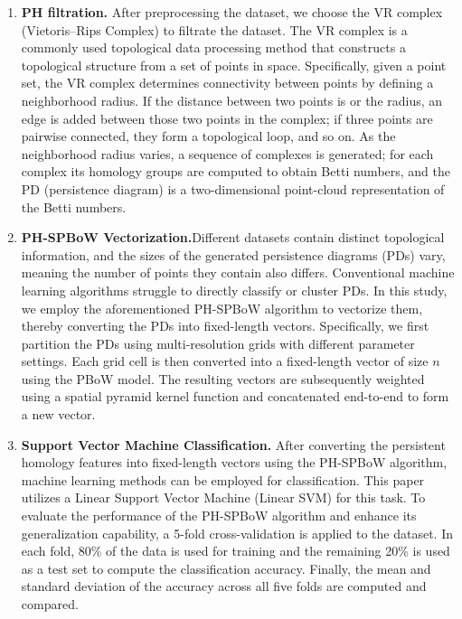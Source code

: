 \documentclass[5GeSdc,ASOC,numref,printGA,printHL,CASflow,nocrossmark,longtitle,PROOF]{/usr/local/texlive/iTemplates/01-Templates/01-Els-Jnl/01-Standard_Templates/V1/ELS_MDL5-V1-6}
\begin{document}
\begin{articlestyle}
\begin{enumerate}
	\item[b)] \textbf{PH filtration.} After preprocessing the dataset, we choose the VR complex (Vietoris--Rips Complex) to filtrate the dataset. The VR complex is a commonly used topological data processing method that constructs a topological structure from a set of points in space. Specifically, given a point set, the VR complex determines connectivity between points by defining a neighborhood radius. If the distance between two points is  or  the radius, an edge is added between those two points in the complex; if three points are pairwise connected, they form a topological loop, and so on. As the neighborhood radius varies, a sequence of complexes is generated; for each complex its homology groups are computed to obtain Betti numbers, and the PD (persistence diagram) is a two-dimensional point-cloud representation of the Betti numbers.
	
	\item[c)] \textbf{PH-SPBoW Vectorization.}Different datasets contain distinct topological information, and the sizes of the generated persistence diagrams (PDs) vary, meaning the number of points they contain also differs. Conventional machine learning algorithms struggle to directly classify or cluster PDs. In this study, we employ the aforementioned PH-SPBoW algorithm to vectorize them, thereby converting the PDs into fixed-length vectors. Specifically, we first partition the PDs using multi-resolution grids with different parameter settings. Each grid cell is then converted into a fixed-length vector of size $n$ using the PBoW model. The resulting vectors are subsequently weighted using a spatial pyramid kernel function and concatenated end-to-end to form a new vector.
	
	\item[d)] \textbf{Support Vector Machine Classification.} After converting the persistent homology features into fixed-length vectors using the PH-SPBoW algorithm, machine learning methods can be employed for classification. This paper utilizes a Linear Support Vector Machine (Linear SVM) for this task. To evaluate the performance of the PH-SPBoW algorithm and enhance its generalization capability, a 5-fold cross-validation is applied to the dataset. In each fold, 80\% of the data is used for training and the remaining 20\% is used as a test set to compute the classification accuracy. Finally, the mean and standard deviation of the accuracy across all five folds are computed and compared.\vspace*{-3pt} 
\end{enumerate}




\end{articlestyle}
\end{document}
